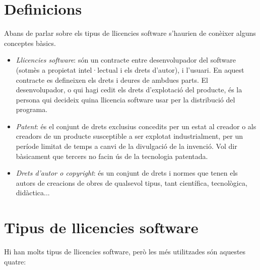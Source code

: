 \section{Definicions}
Abans de parlar sobre els tipus de llicencies software s'haurien 
de conèixer alguns conceptes bàsics.

\begin {itemize}
	\item \emph{Llicencies software}: són un contracte entre desenvolupador 
	del software (sotmès a propietat intel·lectual i els drets d'autor), i l'usuari. 
	En aquest contracte es defineixen els drets i deures de ambdues parts. El 
	desenvolupador, o qui hagi cedit els drets d'explotació del producte, és 
	la persona qui decideix quina llicencia software usar per la distribució del 
	programa.
	\item \emph{Patent}: és el conjunt de drets exclusius concedits per un estat al 
	creador o als creadors de un producte susceptible a ser explotat industrialment, 
	per un període limitat de temps a canvi de la divulgació de la invenció. Vol dir 
	bàsicament que tercers no facin ús de la tecnologia patentada.
	\item \emph{Drets d'autor o \textit{copyright}}: és un conjunt de drets i normes 
	que tenen els autors de creacions de obres de qualsevol tipus, tant científica, 
	tecnològica, didàctica...
\end {itemize}

\section{Tipus de llicencies software}
Hi han molts tipus de llicencies software, però les més utilitzades són aquestes quatre:

